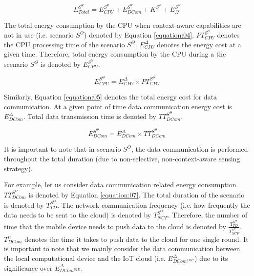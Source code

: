 \documentclass[journal]{IEEEtran}
\begin{document}
\begin{equation}
\label{equation:03}
E_{Total}^{S^{\Psi}} = E_{CPU}^{S^{\Psi}} + E_{DCom}^{S^{\Psi}} +  K^{S^{\Psi}} + E_{\Omega}^{S^{\Psi}}
\end{equation}


The total energy consumption by the CPU when context-aware capabilities are not in use (i.e. scenario $S^{\Theta}$) denoted by Equation \ref{equation:04}. $PT_{CPU}^{S^{\Theta}}$ denotes the CPU processing time of the scenario $S^{\Theta}$. $E_{CPU}^{\Delta}$ denotes the energy cost at a given time. Therefore, total energy consumption by the CPU during a the scenario $S^{\Theta}$ is denoted by $E_{CPU}^{S^{\Theta}}$.



\begin{equation}
\label{equation:04}
E_{CPU}^{S^{\Theta}} =  E_{CPU}^{\Delta} \times PT_{CPU}^{S^{\Theta}}
\end{equation}


Similarly, Equation \ref{equation:05}  denotes the total energy cost for data communication. At a given point of time  data communication energy cost is $E_{DCom}^{\Delta}$. Total data transmission time is denoted by $TT_{DCom}^{S^{\Theta}}$.

\begin{equation}
\label{equation:05}
E_{DCom}^{S^{\Theta}} =  E_{DCom}^{\Delta} \times TT_{DCom}^{S^{\Theta}}
\end{equation}









It is important to note that in scenario $S^{\Theta}$, the  data communication is performed throughout the total duration (due to non-selective, non-context-aware sensing strategy). 


For example, let us consider data communication related  energy consumption. $TT_{DCom}^{S^{\Theta}} $ is denoted by Equation \ref{equation:07}. The total duration of the scenario is denoted by $T_{TD}^{S^{\Theta}}$. The network communication frequency (i.e. how frequently the data needs to be sent to the cloud) is denoted by $T_{NCF}^{S^{\Theta}}$. Therefore, the number of time that the mobile device needs to push data to the cloud is denoted by $\frac{T_{TD}^{S^{\Theta}} }{T_{NCF}^{S^{\Theta}}  }$. $T_{DCom}^{\alpha }$ denotes the time it takes to push data to the cloud for one single round. It is important to  note that we mainly consider the data communication between the local computational device and the IoT cloud (i.e. $E_{DCom^{D2C}}^{\Delta}$) due to its significance over $E_{DCom^{S2D}}^{\Delta}$.
\end{document}
